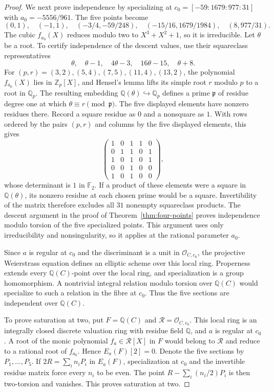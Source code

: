 \documentclass[draft]{publmathdeb}
\theoremstyle{remark}
\numberwithin{equation}{section}
\newcommand{\Q}{\mathbb Q}
\newcommand{\Z}{\mathbb Z}
\newcommand{\F}{\mathbb F}
\begin{document}
\begin{proof}
  We next prove independence by specializing at $c_0=[-59:1679:977:31]$ with $a_0=-5556/961$. The five points become
  \[
    (0,1),\quad(-1,1),\quad(-3/4,-59/248),\quad
    (-15/16,1679/1984),\quad(8,977/31).
  \]
  The cubic $f_{a_0}(X)$ reduces modulo two to $X^3+X^2+1$, so it is irreducible. Let $\theta$ be a root. To certify independence of the descent values, use their squareclass representatives
  \[
    \theta,\quad\theta-1,\quad4\theta-3,\quad16\theta-15,\quad\theta+8.
  \]
  For $(p,r)=(3,2),(5,4),(7,5),(11,4),(13,2)$, the polynomial $f_{a_0}(X)$ lies in $\Z_p[X]$, and Hensel's lemma lifts its simple root $r$ modulo $p$ to a root in $\Q_p$. The resulting embedding $\Q(\theta)\hookrightarrow\Q_p$ defines a prime $\mathfrak p$ of residue degree one at which $\theta\equiv r\pmod{\mathfrak p}$. The five displayed elements have nonzero residues there. Record a square residue as $0$ and a nonsquare as $1$. With rows ordered by the pairs $(p,r)$ and columns by the five displayed elements, this gives
  \begin{equation}\label{eq:rank-five-residue-matrix}
    \begin{pmatrix}
      1 & 0 & 1 & 1 & 0 \\
      0 & 1 & 1 & 0 & 1 \\
      1 & 0 & 1 & 0 & 1 \\
      0 & 0 & 1 & 0 & 0 \\
      1 & 0 & 1 & 0 & 0
    \end{pmatrix},
  \end{equation}
  whose determinant is $1$ in $\F_2$. If a product of these elements were a square in $\Q(\theta)$, its nonzero residue at each chosen prime would be a square. Invertibility of the matrix therefore excludes all $31$ nonempty squareclass products. The descent argument in the proof of Theorem~\ref{thm:four-points} proves independence modulo torsion of the five specialized points. This argument uses only irreducibility and nonsingularity, so it applies at the rational parameter $a_0$.

  Since $a$ is regular at $c_0$ and the discriminant is a unit in $\mathcal O_{C,c_0}$, the projective Weierstrass equation defines an elliptic scheme over this local ring. Properness extends every $\Q(C)$-point over the local ring, and specialization is a group homomorphism. A nontrivial integral relation modulo torsion over $\Q(C)$ would specialize to such a relation in the fibre at $c_0$. Thus the five sections are independent over $\Q(C)$.

  To prove saturation at two, put $F=\Q(C)$ and $\mathcal R=\mathcal O_{C,c_0}$. This local ring is an integrally closed discrete valuation ring with residue field $\Q$, and $a$ is regular at $c_0$. A root of the monic polynomial $f_a\in\mathcal R[X]$ in $F$ would belong to $\mathcal R$ and reduce to a rational root of $f_{a_0}$. Hence $E_a(F)[2]=0$. Denote the five sections by $P_1,\ldots,P_5$. If $2R=\sum_i n_iP_i$ in $E_a(F)$, specialization at $c_0$ and the invertible residue matrix force every $n_i$ to be even. The point $R-\sum_i(n_i/2)P_i$ is then two-torsion and vanishes. This proves saturation at two.


\end{proof}
\end{document}
